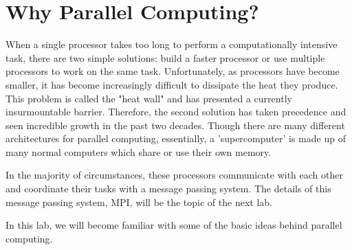 \label{lab:parallel1}

\section*{Why Parallel Computing?}
When a single processor takes too long to perform a computationally intensive task, there are two simple solutions: build a faster processor or use multiple processors to work on the same task.
Unfortunately, as processors have become smaller, it has become increasingly difficult to dissipate the heat they produce.
This problem is called the "heat wall" and has presented a currently insurmountable barrier.
Therefore, the second solution has taken precedence and seen incredible growth in the past two decades.
Though there are many different architectures for parallel computing, essentially, a 'supercomputer' is made up of many normal computers which share or use their own memory.

In the majority of circumstances, these processors communicate with each other and coordinate their tasks with a message passing system. 
The details of this message passing system, MPI, will be the topic of the next lab.

In this lab, we will become familiar with some of the basic ideas behind parallel computing.


